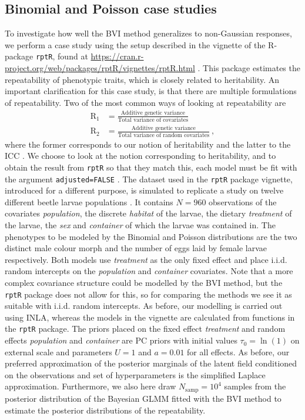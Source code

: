 \subsection{Binomial and Poisson case studies}
To investigate how well the BVI method generalizes to non-Gaussian responses, we perform a case study using the setup described in the vignette of the R-package \texttt{rptR}, found at \url{https://cran.r-project.org/web/packages/rptR/vignettes/rptR.html} \citep{Stoffel2017rptR}. This package estimates the repeatability of phenotypic traits, which is closely related to heritability. An important clarification for this case study, is that there are multiple formulations of repeatability. Two of the most common ways of looking at repeatability are
\begin{equation}
    \begin{aligned}
        \text{R}_1 &= \frac{\text{Additive genetic variance}}{\text{Total variance of covariates}} \\
        \text{R}_2 &= \frac{\text{Additive genetic variance}}{\text{Total variance of random covariates}} \ ,
    \end{aligned}
\end{equation}
where the former corresponds to our notion of heritability \citep{Stoffel2017rptR} and the latter to the ICC \citep{GLMM_book}. We choose to look at the notion corresponding to heritability, and to obtain the result from \texttt{rptR} so that they match this, each model must be fit with the argument \texttt{adjusted=FALSE} \citep{Stoffel2017rptR}. The dataset used in the \texttt{rptR} package vignette, introduced for a different purpose, is simulated to replicate a study on twelve different beetle larvae populations \citep{Stoffel2017rptR}. It contains $N=960$ observations of the covariates \textit{population}, the discrete \textit{habitat} of the larvae, the dietary \textit{treatment} of the larvae, the \textit{sex} and \textit{container} of which the larvae was contained in. The phenotypes to be modeled by the Binomial and Poisson distributions are the two distinct male colour morph and the number of eggs laid by female larvae respectively. Both models use \textit{treatment} as the only fixed effect and place i.i.d. random intercepts on the \textit{population} and \textit{container} covariates. Note that a more complex covariance structure could be modelled by the BVI method, but the \texttt{rptR} package does not allow for this, so for comparing the methods we see it as suitable with i.i.d. random intercepts. As before, our modelling is carried out using INLA, whereas the models in the vignette are calculated from functions in the \texttt{rptR} package. The priors placed on the fixed effect \textit{treatment} and random effects \textit{population} and \textit{container} are PC priors with initial values $\tau_0=\ln(1)$ on external scale and parameters $U=1$ and $a=0.01$ for all effects. As before, our preferred approximation of the posterior marginals of the latent field conditioned on the observations and set of hyperparameters is the simplified Laplace approximation. Furthermore, we also here draw $N_{\text{samp}}=10^4$ samples from the posterior distribution of the Bayesian GLMM fitted with the BVI method to estimate the posterior distributions of the repeatability. 


